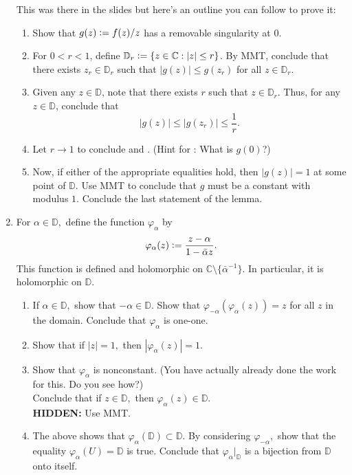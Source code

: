 \documentclass[12pt]{article}
\theoremstyle{definition}
\numberwithin{thm}{section}
\newcommand{\hint}[1]{\textbf{HIDDEN:} {\color[rgb]{0.95, 0.95, 0.95}#1}}
\newcommand{\md}[1]{{\left\lvert #1 \right\lvert}}
\begin{document}
\begin{enumerate}
	This was there in the slides but here's an outline you can follow to prove it:
	\begin{enumerate}
		\item Show that $g(z) \vcentcolon= f(z)/z$ has a removable singularity at $0$.
		\item For $0 < r < 1$, define $\mathbb{D}_{r} \vcentcolon= \{z \in \mathbb{C} : \md{z} \le r\}$. By MMT, conclude that there exists $z_{r} \in \mathbb{D}_{r}$ such that $\md{g(z)} \le g(z_{r})$ for all $z \in \mathbb{D}_{r}$. 
		\item Given any $z \in \mathbb{D}$, note that there exists $r$ such that $z \in \mathbb{D}_{r}$. Thus, for any $z \in \mathbb{D}$, conclude that
		\begin{equation*} 
			\md{g(z)} \le \md{g(z_{r})} \le \frac{1}{r}.
		\end{equation*}
		\item Let $r \to 1$ to conclude  and . (Hint for : What is $g(0)$?)
		\item Now, if either of the appropriate equalities hold, then $\md{g(z)} = 1$ at some point of $\mathbb{D}$. Use MMT to conclude that $g$ must be a constant with modulus $1$. Conclude the last statement of the lemma.
	\end{enumerate}
	\item  For $\alpha \in \mathbb{D},$ define the function $\varphi_\alpha$ by
	\begin{equation*} 
		\varphi_\alpha(z) \vcentcolon= \dfrac{z - \alpha}{1 - \bar{\alpha}z}.
	\end{equation*}
	This function is defined and holomorphic on $\mathbb{C}\setminus\{\bar{\alpha}^{-1}\}.$ In particular, it is holomorphic on $\mathbb{D}.$
	\begin{enumerate}
		\item If $\alpha \in \mathbb{D},$ show that $-\alpha \in \mathbb{D}.$ Show that $\varphi_{-\alpha}(\varphi_\alpha(z)) = z$ for all $z$ in the domain. Conclude that $\varphi_\alpha$ is one-one.
		\item Show that if $|z| = 1,$ then $\left|\varphi_\alpha(z)\right| = 1.$
		\item Show that $\varphi_\alpha$ is nonconstant. (You have actually already done the work for this. Do you see how?) \\
		Conclude that if $z \in \mathbb{D},$ then $\varphi_\alpha(z) \in \mathbb{D}.$\\
		\hint{Use MMT.}
		\item The above shows that $\varphi_\alpha(\mathbb{D}) \subset \mathbb{D}.$ By considering $\varphi_{-\alpha},$ show that the equality $\varphi_\alpha(U) = \mathbb{D}$ is true. Conclude that $\varphi_\alpha|_\mathbb{D}$ is a bijection from $\mathbb{D}$ onto itself.

\end{enumerate}
\end{enumerate}
\end{document}
